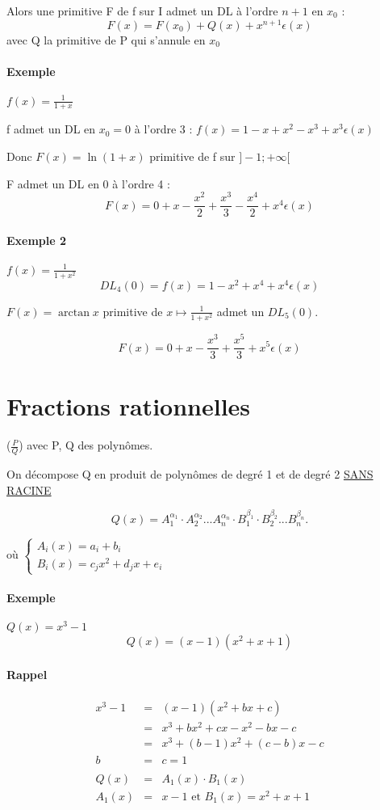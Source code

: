 Alors une primitive F de f sur I admet un DL à l'ordre $n+1$ en $x_0$ : \[F(x) = F(x_0) + Q(x) + x^{n+1}\epsilon (x)\] avec Q la primitive de P qui s'annule en $x_0$

\paragraph{Exemple} $f(x) = \frac{1}{1+x}$

f admet un DL en $x_0=0$ à l'ordre 3 : $f(x) = 1-x+x^2 - x^3 + x^3 \epsilon(x)$

Donc $F(x) = \ln(1+x)$ primitive de f sur $]-1; +\infty[$

F admet un DL en 0 à l'ordre 4 : \[F(x) = 0+x-\frac{x^2}{2} + \frac{x^3}{3} - \frac{x^4}{2} + x^4 \epsilon(x)\]

\paragraph{Exemple 2} $f(x) = \frac{1}{1+x^2}$
\[DL_4(0) = f(x) = 1-x^2 + x^4 + x^4 \epsilon (x)\]

$F(x)=\arctan x$ primitive de $x \mapsto \frac{1}{1+x^2}$ admet un $DL_5(0)$.

\[F(x) = 0 + x -  \frac{x^3}{3} + \frac{x^5}{3} + x^5 \epsilon(x)\]

\section{Fractions rationnelles} ($\frac{P}{Q}$) avec P, Q des polynômes.

On décompose Q en produit de polynômes de degré 1 et de degré 2 \ul{SANS RACINE}

\[Q(x) = A_1^{\alpha_1} \cdot A_2^{\alpha_2} ... A_n^{\alpha_n} \cdot B_1^{\beta_1} \cdot B_2^{\beta_2} ... B_n^{\beta_n} . \]

où $\left\{\begin{array}{c}
		A_i(x) = a_i+b_i \\
	B_i(x) = c_jx^2 + d_jx + e_i\end{array}\right.$

	\paragraph{Exemple} $ Q(x) = x^3 - 1$ \[Q(x) = (x-1)(x^2 + x + 1) \]

	\paragraph{Rappel}
	\[\begin{array}{rcl}
			x^3 - 1 &=&  (x-1)(x^2 + bx + c) \\
						  &=& x^3 + bx^2 + cx - x^2 - bx - c \\
					   &=& x^3 + (b-1)x^2 + (c-b)x - c \\
			b &=& c = 1 \\
			~\\
			Q(x) &=& A_1(x) \cdot B_1(x) \\
			A_1(x) &=& x-1 \text{ et } B_1(x) = x^2 + x + 1
	\end{array}\]

